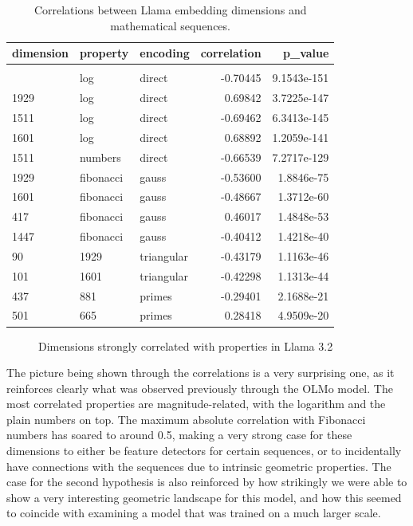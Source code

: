 \documentclass[
  a4paper, twoside, 10pt, titlepage]{book}
\makeatletter
\newcommand*\pandocbounded[1]{%
  \sbox\pandoc@box{#1}%
  \Gscale@div\@tempa{\textheight}{\dimexpr\ht\pandoc@box+\dp\pandoc@box\relax}%
  \Gscale@div\@tempb{\linewidth}{\wd\pandoc@box}%
  \ifdim\@tempb\p@<\@tempa\p@\let\@tempa\@tempb\fi%
  \ifdim\@tempa\p@<\p@\scalebox{\@tempa}{\usebox\pandoc@box}%
  \else\usebox{\pandoc@box}%
  \fi%
}
\makeatother
\begin{document}
\begin{longtable}[]{@{}lllrr@{}}
\toprule\noalign{}
dimension & property & encoding & correlation & p\_value \\
\midrule\noalign{}
\endhead
\bottomrule\noalign{}
\tabularnewline
\caption{Correlations between Llama embedding dimensions and
mathematical sequences.}
\endlastfoot
417 & log & direct & -0.70445 & 9.1543e-151 \\
1929 & log & direct & 0.69842 & 3.7225e-147 \\
1511 & log & direct & -0.69462 & 6.3413e-145 \\
1601 & log & direct & 0.68892 & 1.2059e-141 \\
1511 & numbers & direct & -0.66539 & 7.2717e-129 \\
1929 & fibonacci & gauss & -0.53600 & 1.8846e-75 \\
1601 & fibonacci & gauss & -0.48667 & 1.3712e-60 \\
417 & fibonacci & gauss & 0.46017 & 1.4848e-53 \\
1447 & fibonacci & gauss & -0.40412 & 1.4218e-40 \\
90 & 1929 & triangular & -0.43179 & 1.1163e-46 \\
101 & 1601 & triangular & -0.42298 & 1.1313e-44 \\
437 & 881 & primes & -0.29401 & 2.1688e-21 \\
501 & 665 & primes & 0.28418 & 4.9509e-20 \\
\end{longtable}

\begin{figure}
\centering
\pandocbounded{}
\caption{Dimensions strongly correlated with properties in Llama
3.2}\label{fig:llama-properties}
\end{figure}

The picture being shown through the correlations is a very surprising
one, as it reinforces clearly what was observed previously through the
OLMo model. The most correlated properties are magnitude-related, with
the logarithm and the plain numbers on top. The maximum absolute
correlation with Fibonacci numbers has soared to around 0.5, making a
very strong case for these dimensions to either be feature detectors for
certain sequences, or to incidentally have connections with the
sequences due to intrinsic geometric properties. The case for the second
hypothesis is also reinforced by how strikingly we were able to show a
very interesting geometric landscape for this model, and how this seemed
to coincide with examining a model that was trained on a much larger
scale.
\end{document}

